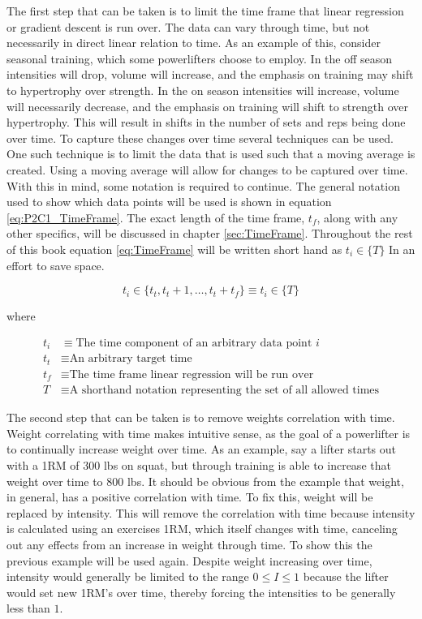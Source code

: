 The first step that can be taken is to limit the time frame that linear regression or gradient descent is run over. The data can vary through time, but not necessarily in direct linear relation to time. As an example of this, consider seasonal training, which some powerlifters choose to employ. In the off season intensities will drop, volume will increase, and the emphasis on training may shift to hypertrophy over strength. In the on season intensities will increase, volume will necessarily decrease, and the emphasis on training will shift to strength over hypertrophy. This will result in shifts in the number of sets and reps being done over time. To capture these changes over time several techniques can be used. One such technique is to limit the data that is used such that a moving average is created. Using a moving average will allow for changes to be captured over time. With this in mind, some notation is required to continue. The general notation used to show which data points will be used is shown in equation \ref{eq:P2C1_TimeFrame}. The exact length of the time frame, $t_f$, along with any other specifics, will be discussed in chapter \ref{sec:TimeFrame}. Throughout the rest of this book equation \ref{eq:TimeFrame} will be written short hand as $t_i\in \{ T \}$ In an effort to save space.

\begin{equation}
    \label{eq:P2C1_TimeFrame}
    t_i \in\{ t_t, t_t+1,\dots,t_t+t_f \}
    \equiv t_i \in \{ T \}
\end{equation}
\centerline{where}
\begin{equation*}
    \begin{split}
        t_i &\equiv \text{The time component of an arbitrary data point }i \\
        t_t &\equiv \text{An arbitrary target time} \\
        t_f &\equiv \text{The time frame linear regression will be run over} \\
        T & \equiv \text{A shorthand notation representing the set of all allowed times}
    \end{split}
\end{equation*}

The second step that can be taken is to remove weights correlation with time. Weight correlating with time makes intuitive sense, as the goal of a powerlifter is to continually increase weight over time. As an example, say a lifter starts out with a 1RM of $300$ lbs on squat, but through training is able to increase that weight over time to $800$ lbs. It should be obvious from the example that weight, in general, has a positive correlation with time. To fix this, weight will be replaced by intensity. This will remove the correlation with time because intensity is calculated using an exercises 1RM, which itself changes with time, canceling out any effects from an increase in weight through time. To show this the previous example will be used again. Despite weight increasing over time, intensity would generally be limited to the range $0\le I\le 1$ because the lifter would set new 1RM's over time, thereby forcing the intensities to be generally less than $1$.

